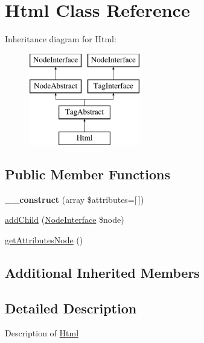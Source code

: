 \hypertarget{class_pes_1_1_dom_1_1_node_1_1_tag_1_1_html}{}\section{Html Class Reference}
\label{class_pes_1_1_dom_1_1_node_1_1_tag_1_1_html}
Inheritance diagram for Html\+:\begin{figure}[H]
\begin{center}
\leavevmode
\includegraphics[height=4.000000cm]{class_pes_1_1_dom_1_1_node_1_1_tag_1_1_html}
\end{center}
\end{figure}
\subsection*{Public Member Functions}
\begin{DoxyCompactItemize}
\item 
\mbox{\label{class_pes_1_1_dom_1_1_node_1_1_tag_1_1_html_afe55bc1439758d475e70446a774807d9}} 
{\bfseries \+\_\+\+\_\+construct} (array \$attributes=\mbox{[}$\,$\mbox{]})
\item 
\mbox{\hyperlink{class_pes_1_1_dom_1_1_node_1_1_tag_1_1_html_a1d59c3782ba90a94f31ee6c58d86e9fc}{add\+Child}} (\mbox{\hyperlink{interface_pes_1_1_dom_1_1_node_1_1_node_interface}{Node\+Interface}} \$node)
\item 
\mbox{\hyperlink{class_pes_1_1_dom_1_1_node_1_1_tag_1_1_html_a4722e7722b245351681b05d35f6694f3}{get\+Attributes\+Node}} ()
\end{DoxyCompactItemize}
\subsection*{Additional Inherited Members}


\subsection{Detailed Description}
Description of \mbox{\hyperlink{class_pes_1_1_dom_1_1_node_1_1_tag_1_1_html}{Html}}

